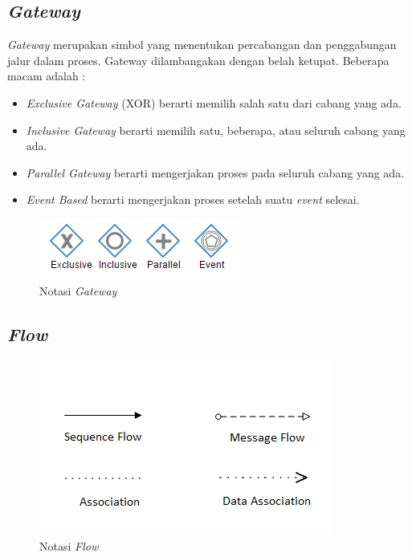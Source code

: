 \subsection{\textit{Gateway}}
\label{sec:gateway}
\textit{Gateway} merupakan simbol yang menentukan percabangan dan penggabungan jalur dalam proses. Gateway dilambangakan dengan belah ketupat. Beberapa macam adalah :
\begin{itemize}
	\item \textit{Exclusive Gateway} (XOR) berarti memilih salah satu dari cabang yang ada. 
	\item \textit{Inclusive Gateway} berarti memilih satu, beberapa, atau seluruh cabang yang ada.
	\item \textit{Parallel Gateway} berarti mengerjakan proses pada seluruh cabang yang ada.
	\item \textit{Event Based} berarti mengerjakan proses setelah suatu \textit{event} selesai.
\end{itemize} 
\begin{figure}[H]
	\centering
	\includegraphics[scale=1]{Gambar/Bab-2/bpmn/gateway}
	\caption{Notasi \textit{Gateway}} 
	\label{gateway}
\end{figure}


\subsection{\textit{Flow}}
\label{sec:flow}

\begin{figure}[H]
	\centering
	\includegraphics[scale=1]{Gambar/Bab-2/bpmn/flow}
	\caption{Notasi \textit{Flow}} 
	\label{flow}
\end{figure}

